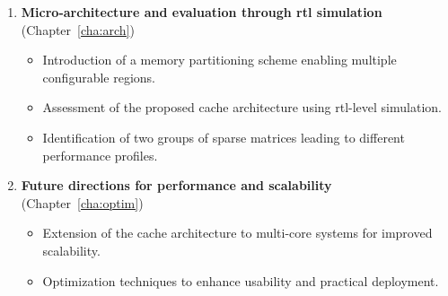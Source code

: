\begin{enumerate}
    \item \textbf{Micro-architecture and evaluation through \acrshort{rtl} simulation} {\raggedleft \hfill (Chapter~\ref{cha:arch})}
    \begin{itemize}
        \item Introduction of a memory partitioning scheme enabling multiple configurable regions.
        \item Assessment of the proposed cache architecture using \acrshort{rtl}-level simulation.
        \item Identification of two groups of sparse matrices leading to different performance profiles.
    \end{itemize}

    \item \textbf{Future directions for performance and scalability} {\raggedleft \hfill (Chapter~\ref{cha:optim})}
    \begin{itemize}
        \item Extension of the cache architecture to multi-core systems for improved scalability.
        \item Optimization techniques to enhance usability and practical deployment.
    \end{itemize}
\end{enumerate}

\cleardoublepage %